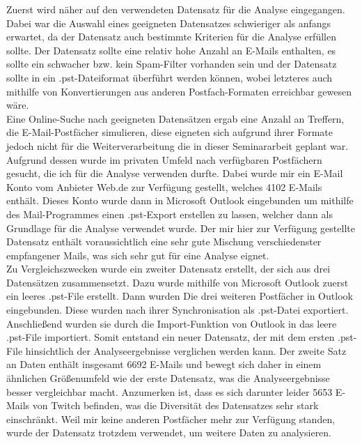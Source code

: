 Zuerst wird näher auf den verwendeten Datensatz für die Analyse eingegangen. Dabei war die Auswahl eines geeigneten Datensatzes schwieriger als anfangs erwartet, da der Datensatz auch bestimmte Kriterien für die Analyse erfüllen sollte. Der Datensatz sollte eine relativ hohe Anzahl an E-Mails enthalten, es sollte ein schwacher bzw. kein Spam-Filter vorhanden sein und der Datensatz sollte in ein .pst-Dateiformat überführt werden können, wobei letzteres auch mithilfe von Konvertierungen aus anderen Postfach-Formaten erreichbar gewesen wäre.\\

Eine Online-Suche nach geeigneten Datensätzen ergab eine Anzahl an Treffern, die E-Mail-Postfächer simulieren, diese eigneten sich aufgrund ihrer Formate jedoch nicht für die Weiterverarbeitung die in dieser Seminararbeit geplant war. Aufgrund dessen wurde im privaten Umfeld nach verfügbaren Postfächern gesucht, die ich für die Analyse verwenden durfte. Dabei wurde mir ein E-Mail Konto vom Anbieter \glqq{}Web.de\grqq{} zur Verfügung gestellt, welches 4102 E-Mails enthält. Dieses Konto wurde dann in Microsoft Outlook eingebunden um mithilfe des Mail-Programmes einen .pst-Export erstellen zu lassen, welcher dann als Grundlage für die Analyse verwendet wurde. Der mir hier zur Verfügung gestellte Datensatz enthält voraussichtlich eine sehr gute Mischung verschiedenster empfangener Mails, was sich sehr gut für eine Analyse eignet. \\

Zu Vergleichszwecken wurde ein zweiter Datensatz erstellt, der sich aus drei Datensätzen zusammensetzt. Dazu wurde mithilfe von Microsoft Outlook zuerst ein leeres .pst-File erstellt. Dann wurden Die drei weiteren Postfächer in Outlook eingebunden. Diese wurden nach ihrer Synchronisation als .pst-Datei exportiert. Anschließend wurden sie durch die Import-Funktion von Outlook in das leere .pst-File importiert. Somit entstand ein neuer Datensatz, der mit dem ersten .pst-File hinsichtlich der Analyseergebnisse verglichen werden kann. Der zweite Satz an Daten enthält insgesamt 6692 E-Mails und bewegt sich daher in einem ähnlichen Größenumfeld wie der erste Datensatz, was die Analyseergebnisse besser vergleichbar macht. Anzumerken ist, dass es sich darunter leider 5653 E-Mails von \glqq{}Twitch\grqq{} befinden, was die Diversität des Datensatzes sehr stark einschränkt. Weil mir keine anderen Postfächer mehr zur Verfügung standen, wurde der Datensatz trotzdem verwendet, um weitere Daten zu analysieren. 
